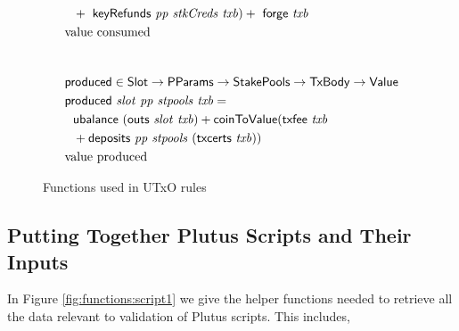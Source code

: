 \begin{figure}[htb]
\begin{align*}
        &~~+~ \keyRefunds{pp}{stkCreds}{txb}) +
        ~\fun{forge}~\var{txb} \\
    & \text{value consumed} \\
    \nextdef
    & \fun{produced} \in \Slot \to \PParams \to \StakePools \to \TxBody \to \Value \\
    & \fun{produced}~\var{slot}~\var{pp}~\var{stpools}~\var{txb} = \\
    &~~\ubalance{(\outs{slot}~{txb})}  + \fun{coinToValue}(\txfee{txb} \\
    &~~+ \deposits{pp}{stpools}~{(\txcerts{txb})})\\
    & \text{value produced}
  \end{align*}
  \caption{Functions used in UTxO rules}
  \label{fig:functions:utxo}
\end{figure}

\clearpage

\subsection{Putting Together Plutus Scripts and Their Inputs}
\label{sec:scripts-inputs}

In Figure \ref{fig:functions:script1} we give the helper functions needed to
retrieve all the data relevant to validation of Plutus scripts.
This includes,

